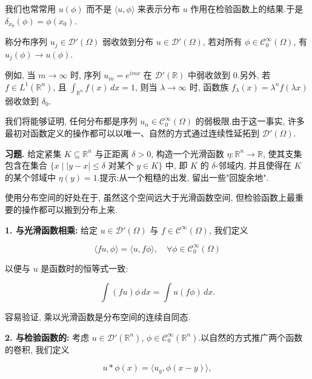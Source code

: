 \begin{remark*}
我们也常常用 $u(\phi)$ 而不是 $\langle u, \phi\rangle$ 来表示分布 $u$ 作用在检验函数上的结果.于是 $\delta_{x_0}(\phi) = \phi(x_0)$.
\end{remark*}

\begin{definition}\label{def:c3-2.4}
称分布序列 $u_j\in\mathcal{D}'(\Omega)$ 弱收敛到分布 $u\in\mathcal{D}'(\Omega)$, 若对所有 $\phi\in\mathcal{C}_0^{\infty}(\Omega)$, 有 $u_j(\phi)\to u(\phi)$.
\end{definition}

例如, 当 $m\to\infty$ 时, 序列 $u_m = e^{imx}$ 在 $\mathcal{D}'(\mathbb{R})$ 中弱收敛到 0.另外, 若 $f\in L^1(\mathbb{R}^n)$, 且 $\int_{\mathbb{R}^n}f(x)\, dx = 1$, 则当 $\lambda\to\infty$ 时, 函数族 $f_{\lambda}(x) = \lambda^n f(\lambda x)$ 弱收敛到 $\delta_0$.

我们将能够证明, 任何分布都是序列 $u_n\in\mathcal{C}_0^{\infty}(\Omega)$ 的弱极限.由于这一事实, 许多最初对函数定义的操作都可以以唯一、自然的方式通过连续性延拓到 $\mathcal{D}'(\Omega)$.

\textbf{习题.} 给定紧集 $K\subseteq\mathbb{R}^n$ 与正距离 $\delta>0$, 构造一个光滑函数 $\eta : \mathbb{R}^n\to\mathbb{R}$, 使其支集包含在集合 $\{x \mid |y-x|\leq\delta \text{ 对某个 } y\in K\}$ 中, 即 $K$ 的 $\delta$-邻域内, 并且使得在 $K$ 的某个邻域中 $\eta(y) = 1$.提示:从一个粗糙的出发, 留出一些"回旋余地".


使用分布空间的好处在于, 虽然这个空间远大于光滑函数空间, 但检验函数上最重要的操作都可以搬到分布上来.

\textbf{1. 与光滑函数相乘:} 给定 $u\in\mathcal{D}'(\Omega)$ 与 $f\in\mathcal{C}^{\infty}(\Omega)$, 我们定义

\[
\langle fu, \phi\rangle = \langle u, f\phi\rangle, \quad \forall\phi\in\mathcal{C}_0^{\infty}(\Omega)
\]

以便与 $u$ 是函数时的恒等式一致:

\[
\int(fu)\phi\, dx = \int u(f\phi)\, dx.
\]

容易验证, 乘以光滑函数是分布空间的连续自同态.

\textbf{2. 与检验函数的:} 考虑 $u\in\mathcal{D}'(\mathbb{R}^n)$, $\phi\in\mathcal{C}_0^{\infty}(\mathbb{R}^n)$.以自然的方式推广两个函数的卷积, 我们定义

\[
u*\phi(x) = \langle u_y, \phi(x-y)\rangle,
\]

